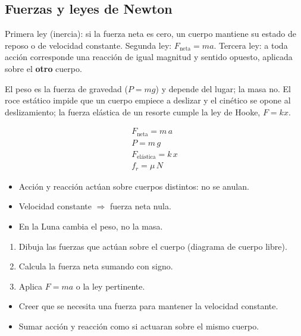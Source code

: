 \documentclass[10pt,a4paper,twocolumn]{article}
\begin{document}
\subsection{Fuerzas y leyes de Newton}

Primera ley (inercia): si la fuerza neta es cero, un cuerpo mantiene su estado de reposo o de velocidad constante. Segunda ley: $F_{\text{neta}}=ma$. Tercera ley: a toda acción corresponde una reacción de igual magnitud y sentido opuesto, aplicada sobre el \textbf{otro} cuerpo.

El peso es la fuerza de gravedad ($P=mg$) y depende del lugar; la masa no. El roce estático impide que un cuerpo empiece a deslizar y el cinético se opone al deslizamiento; la fuerza elástica de un resorte cumple la ley de Hooke, $F=kx$.

\begin{ley}[Fórmulas]
\begin{gather*}
F_{\text{neta}}=m\,a \\
P=m\,g \\
F_{\text{elástica}}=k\,x \\
f_r=\mu\,N
\end{gather*}
\end{ley}

\begin{ideasclave}
\begin{itemize}
  \item Acción y reacción actúan sobre cuerpos distintos: no se anulan.
  \item Velocidad constante $\Rightarrow$ fuerza neta nula.
  \item En la Luna cambia el peso, no la masa.
\end{itemize}
\end{ideasclave}

\begin{metodo}
\begin{enumerate}
  \item Dibuja las fuerzas que actúan sobre el cuerpo (diagrama de cuerpo libre).
  \item Calcula la fuerza neta sumando con signo.
  \item Aplica $F=ma$ o la ley pertinente.
\end{enumerate}
\end{metodo}

\begin{errorfrecuente}
\begin{itemize}
  \item Creer que se necesita una fuerza para mantener la velocidad constante.
  \item Sumar acción y reacción como si actuaran sobre el mismo cuerpo.
\end{itemize}
\end{errorfrecuente}
\end{document}
